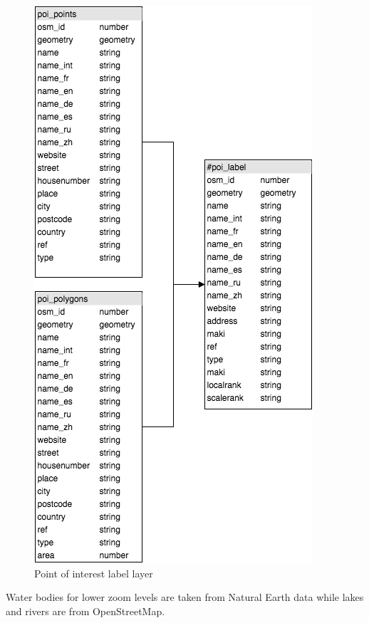 \begin{figure}[h]
  \includegraphics[scale=0.6]{images/poi_layer.png}
  \caption{Point of interest label layer}
\end{figure}


\newpage
Water bodies for lower zoom levels are taken from Natural Earth
data while lakes and rivers are from OpenStreetMap.


